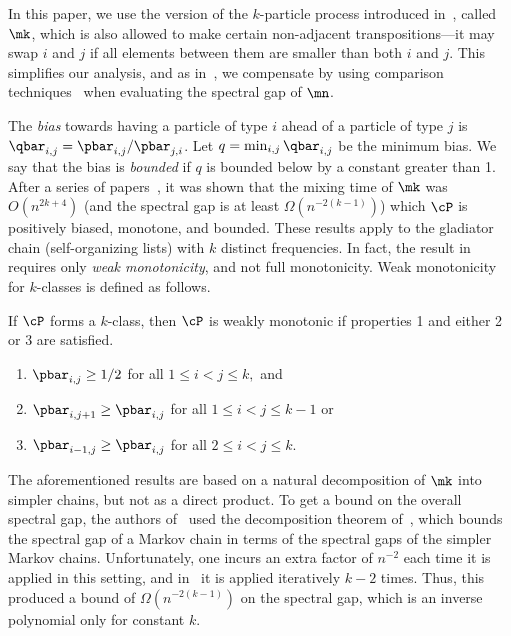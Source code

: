 \documentclass{toc}
\begin{document}
In this paper, we use the version of the $k$-particle process 
introduced in~\cite{MS}, called $\mk$, which is also allowed to make 
certain non-adjacent transpositions---it may swap $i$ and $j$ if all 
elements between them are smaller than both $i$ and $j$.  This 
simplifies our analysis, and as in~\cite{MS}, we compensate by using 
comparison techniques~\cite{dsc, RT98} when evaluating the spectral gap 
of $\mn$.
 
The \emph{bias} towards having a particle of type $i$ ahead of a 
particle of type $j$ is $\qbar_{i,j} = \pbar_{i,j}/\pbar_{j,i}$.  Let 
$q=\min_{i,j}\qbar_{i,j}$ be the minimum bias. We say that the bias is 
\emph{bounded} if $q$ is bounded below by a constant greater than 1. 
After a series of papers~\cite{HW16,MS}, it was shown that the mixing time
of $\mk$ was $O(n^{2k+4})$ (and the spectral 
gap is at least $\Omega(n^{-2(k-1)})$) 
which $\cP$ is positively biased, monotone, and bounded. %
%
%
%
%
%
%
These results apply to the 
gladiator chain (self-organizing lists) with $k$ distinct frequencies.  
In fact, the result in~\cite{MS} requires only \emph{weak 
monotonicity}, and not full monotonicity.  Weak monotonicity for 
$k$-classes is defined as follows.

\begin{definition} If $\cP$ forms a $k$-class, 
then $\cP$ is weakly monotonic if properties 1 and either 2 or 3 are satisfied.
\begin{enumerate}
\item $\pbar_{i,j} \geq 1/2$ for all $1 \leq i < j \leq k,$ and
\item $\pbar_{i,j+1} \geq \pbar_{i,j}$ for all $1 \leq i < j \leq k-1$ or
\item $\pbar_{i-1,j} \geq \pbar_{i,j}$ for all $2 \leq i < j \leq k.$
\end{enumerate}
\end{definition}

The aforementioned results are based on a natural decomposition of 
$\mk$ into simpler chains, but not as a direct product. To get a bound 
on the overall spectral gap, the authors of~\cite{MS} used the 
decomposition theorem of~\cite{MR00}, which bounds the spectral gap of 
a Markov chain in terms of the spectral gaps of the simpler Markov 
chains. Unfortunately, one incurs an extra factor of $n^{-2}$ each time 
it is applied in this setting, and in~\cite{MS} it is applied 
iteratively $k-2$ times. Thus, this produced a bound
%
of $\Omega(n^{-2(k-1)})$ on the spectral gap,
which is an inverse polynomial only for constant $k$.
\end{document}

